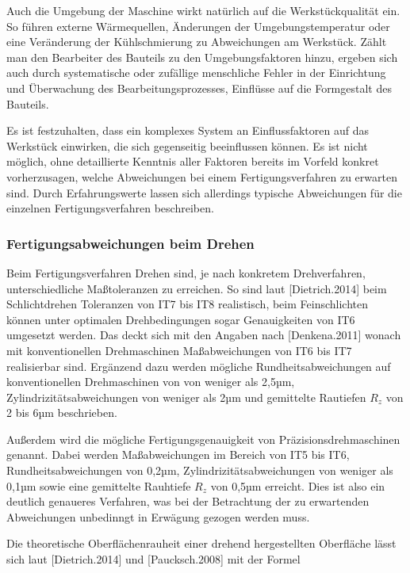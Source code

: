 Auch die Umgebung der Maschine wirkt natürlich auf die Werkstückqualität ein. So führen externe Wärmequellen, Änderungen der Umgebungstemperatur oder eine Veränderung der Kühlschmierung zu Abweichungen am Werkstück. Zählt man den Bearbeiter des Bauteils zu den Umgebungsfaktoren hinzu, ergeben sich auch durch systematische oder zufällige menschliche Fehler in der Einrichtung und Überwachung des Bearbeitungsprozesses, Einflüsse auf die Formgestalt des Bauteils. 

Es ist festzuhalten, dass ein komplexes System an Einflussfaktoren auf das Werkstück einwirken, die sich gegenseitig beeinflussen können. Es ist nicht möglich, ohne detaillierte Kenntnis aller Faktoren bereits im Vorfeld konkret vorherzusagen, welche Abweichungen bei einem Fertigungsverfahren zu erwarten sind. Durch Erfahrungswerte lassen sich allerdings typische Abweichungen für die einzelnen Fertigungsverfahren beschreiben. 

\subsubsection {Fertigungsabweichungen beim Drehen}

Beim Fertigungsverfahren Drehen sind, je nach konkretem Drehverfahren, unterschiedliche Maßtoleranzen zu erreichen. So sind laut [Dietrich.2014] beim Schlichtdrehen Toleranzen von IT7 bis IT8 realistisch, beim Feinschlichten können unter optimalen Drehbedingungen sogar Genauigkeiten von IT6 umgesetzt werden. Das deckt sich mit den Angaben nach [Denkena.2011] wonach mit konventionellen Drehmaschinen Maßabweichungen von IT6 bis IT7 realisierbar sind. Ergänzend dazu werden mögliche Rundheitsabweichungen auf konventionellen Drehmaschinen von von weniger als 2,5µm, Zylindrizitätsabweichungen von weniger als 2µm und gemittelte Rautiefen $R_{z}$ von 2 bis 6µm beschrieben. 

Außerdem wird die mögliche Fertigungsgenauigkeit von Präzisionsdrehmaschinen genannt. Dabei werden Maßabweichungen im Bereich von IT5 bis IT6, Rundheitsabweichungen von 0,2µm, Zylindrizitätsabweichungen von weniger als 0,1µm sowie eine gemittelte Rauhtiefe $R_{z}$ von 0,5µm erreicht. Dies ist also ein deutlich genaueres Verfahren, was bei der Betrachtung der zu erwartenden Abweichungen unbedinngt in Erwägung gezogen werden muss. 

Die theoretische Oberflächenrauheit einer drehend hergestellten Oberfläche lässt sich laut [Dietrich.2014] und [Paucksch.2008] mit der Formel 

